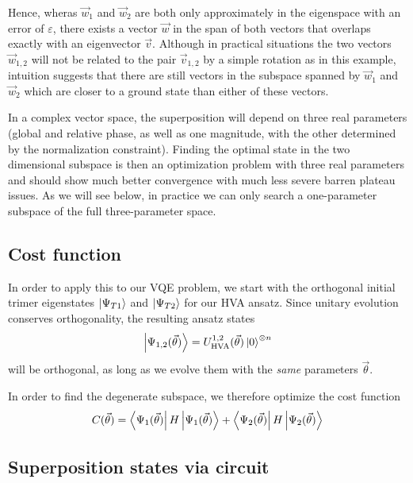 \documentclass[a4paper,12pt]{article}
\begin{document}
Hence, wheras $\vec w_1$ and $\vec w_2$ are both only approximately in the eigenspace with an error of $\varepsilon$, there exists a vector $\vec w$ in the span of both vectors that overlaps exactly with an eigenvector $\vec v$. Although in practical situations the two vectors $\vec w_{1,2}$ will not be related to the pair $\vec v_{1,2}$ by a simple rotation as in this example, intuition suggests that there are still vectors in the subspace spanned by $\vec w_1$ and $\vec w_2$ which are closer to a ground state than either of these vectors.

In a complex vector space, the superposition will depend on three real parameters (global and relative phase, as well as one magnitude, with the other determined by the normalization constraint). Finding the optimal state in the two dimensional subspace is then an optimization problem with three real parameters and should show much better convergence with much less severe barren plateau issues. As we will see below, in practice we can only search a one-parameter subspace of the full three-parameter space.

\subsection{Cost function}
In order to apply this to our VQE problem, we start with the orthogonal initial trimer eigenstates $\left\vert{\Psi_{T1}}\right\rangle$ and $\left\vert{\Psi_{T2}}\right\rangle$ for our HVA ansatz. Since unitary evolution conserves orthogonality, the resulting ansatz states 
\begin{equation}
\left\vert{\Psi_{1,2}(\vec\theta)}\right\rangle = U_\text{HVA}^{1,2}(\vec\theta) \left\vert{0}\right\rangle^{\otimes n}
\end{equation}
will be orthogonal, as long as we evolve them with the \emph{same} parameters $\vec\theta$.

In order to find the degenerate subspace, we therefore optimize the cost function
\begin{equation}\label{eqn:cost-function}
 C(\vec\theta) = \left\langle{\Psi_1(\vec\theta)}\right\vert H \left\vert{\Psi_1(\vec\theta)}\right\rangle + \left\langle{\Psi_2(\vec\theta)}\right\vert H \left\vert{\Psi_2(\vec\theta)}\right\rangle
\end{equation}




\subsection{Superposition states via circuit}
\end{document}
